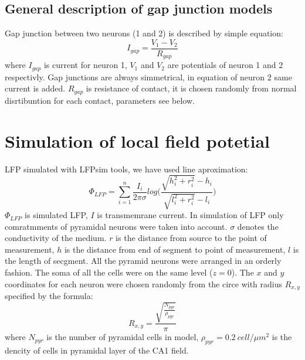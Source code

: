 \documentclass[a4paper,12pt]{article}
\begin{document}
\subsection{General description of gap junction models}
Gap junction between two neurons (1 and 2) is described by simple equation:
\begin{equation}
I_{gap} = \frac{V_{1} - V_{2}}{R_{gap}}
\end{equation}
where $I_{gap}$ is current for neuron 1, $V_{1}$ and $V_{2}$ are potentials of neuron 1 and 2 respectivly. Gap junctions are always simmetrical, in equation of neuron 2 same current is added. $R_{gap}$ is resistance of contact, it is chosen randomly from normal disrtibuntion for each contact, parameters see below.






\section{Simulation of local field potetial} \label{field_potetial_model}
LFP simulated with LFPsim tools, we have used line aproximation:
\begin{equation} 
\Phi_{LFP} = \sum^{n}_{i=1}{ \frac{I_i}{2\pi \sigma}log \Big(\frac{\sqrt{h_i^2 + r_i^2}-h_i}{\sqrt{l_i^2 + r_i^2}-l_i} } \Big)
\end{equation}
$\Phi_{LFP}$ is simulated LFP, $I$ is transmemrane current.
In simulation of LFP only comratmments of pyramidal neurons were taken into account. $\sigma$ denotes
the conductivity of the medium. $r$ is the distance from
source to the point of measurement, $h$ is the distance from end of segment to point of measurement, $l$ is the length of secgment. All the pyramid neurons were arranged in an orderly fashion. The soma of all the cells were on the same level ($z=0$). The $x$ and $y$ coordinates for each neuron were chosen randomly from the circe with radius $R_{x, y}$ specified by the formula:
\begin{equation} 
R_{x, y} = \frac{\sqrt{\frac{N_{pyr}}{\rho_{pyr}} }} {\pi}
\end{equation}
where $N_{pyr}$ is the number of pyramidal cells in model, $\rho_{pyr} = 0.2 \ cell/\mu m^2$ is the dencity of cells in pyramidal layer of the CA1 field.
\end{document}
